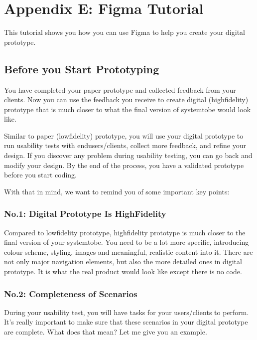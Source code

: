 \documentclass[letterpaper,10pt,english]{jupyterBook}
\begin{document}
\chapter{Appendix E: Figma Tutorial}
\label{\detokenize{appendices/appendix_e/figma_guide:appendix-e-figma-tutorial}}\label{\detokenize{appendices/appendix_e/figma_guide::doc}}
\sphinxAtStartPar
This tutorial shows you how you can use Figma to help you create your digital prototype.


\section{Before you Start Prototyping}
\label{\detokenize{appendices/appendix_e/figma_guide:before-you-start-prototyping}}
\sphinxAtStartPar
You have completed your paper prototype and collected feedback from your clients.  Now you can use the feedback you
receive to create digital (high\sphinxhyphen{}fidelity) prototype that is much closer to what the final version of system\sphinxhyphen{}to\sphinxhyphen{}be
would look like.

\sphinxAtStartPar
Similar to paper (low\sphinxhyphen{}fidelity) prototype, you will use your digital prototype to run usability tests with
end\sphinxhyphen{}users/clients, collect more feedback, and refine your design. If you discover any problem during usability
testing, you can go back and modify your design.  By the end of the process, you have a validated prototype
before you start coding.

\sphinxAtStartPar
With that in mind, we want to remind you of some important key points:


\subsection{No.1: Digital Prototype Is High\sphinxhyphen{}Fidelity}
\label{\detokenize{appendices/appendix_e/figma_guide:no-1-digital-prototype-is-high-fidelity}}
\sphinxAtStartPar
Compared to low\sphinxhyphen{}fidelity prototype, high\sphinxhyphen{}fidelity prototype is much closer to the final version of your
system\sphinxhyphen{}to\sphinxhyphen{}be. You need to be a lot more specific, introducing colour scheme, styling, images and meaningful,
realistic content into it. There are not only major navigation elements, but also the more detailed ones in digital
prototype. It is what the real product would look like \sphinxhyphen{} except there is no code.


\subsection{No.2: Completeness of Scenarios}
\label{\detokenize{appendices/appendix_e/figma_guide:no-2-completeness-of-scenarios}}
\sphinxAtStartPar
During your usability test, you will have tasks for your users/clients to perform. It’s really important to make
sure that these scenarios in your digital prototype are complete. What does that mean? Let me give you an example.
\end{document}
